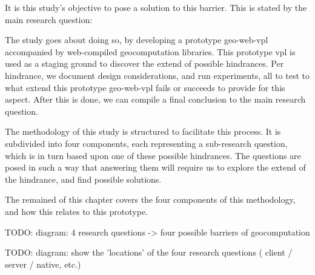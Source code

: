 It is this study's objective to pose a solution to this barrier. This is stated by the main research question: \myMainRQ 

The study goes about doing so, by developing a prototype \ac{geo-web-vpl} accompanied by web-compiled geocomputation libraries. 
This prototype vpl is used as a staging ground to discover the extend of possible hindrances. 
Per hindrance, we document design considerations, and run experiments, all to test to what extend this prototype \ac{geo-web-vpl} fails or succeeds to provide for this aspect. 
After this is done, we can compile a final conclusion to the main research question. 

The methodology of this study is structured to facilitate this process. 
It is subdivided into four components, each representing a sub-research question, which is in turn based upon one of these possible hindrances. The questions are posed in such a way that answering them will require us to explore the extend of the hindrance, and find possible solutions.

The remained of this chapter covers the four components of this methodology, and how this relates to this prototype. 

\begin{note}
TODO: diagram: 4 research questions -> four possible barriers of geocomputation
\end{note}

\begin{note}
TODO: diagram: show the 'locations' of the four research questions ( client / server / native, etc.)
\end{note}


\section{\mySubRQOneTitle} 
\label{sec:method-one}

